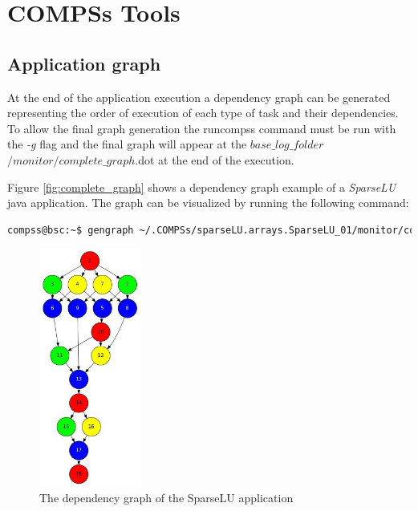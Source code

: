 \section{COMPSs Tools}
\label{sec:Tools}

\subsection{Application graph}
At the end of the application execution a dependency graph can be generated representing the order of execution of each type of 
task and their dependencies. To allow the final graph generation the runcompss command must be run with the \textit{-g} flag 
and the final graph will appear at the \textit{$base\_log\_folder$}$/monitor/complete\_graph$.dot at the end of the execution.

Figure \ref{fig:complete_graph} shows a dependency graph example of a \textit{SparseLU} java application. The graph can be
visualized by running the following command:
\begin{lstlisting}[language=bash]
compss@bsc:~$ gengraph ~/.COMPSs/sparseLU.arrays.SparseLU_01/monitor/complete_graph.dot
\end{lstlisting}

\begin{figure}[h!]
  \centering
    \includegraphics[width=0.3\textwidth]{./Sections/4_Tools/Figures/dependency_graph.jpeg}
    \caption{The dependency graph of the SparseLU application}
\end{figure}
\label{fig:complete_graph}


